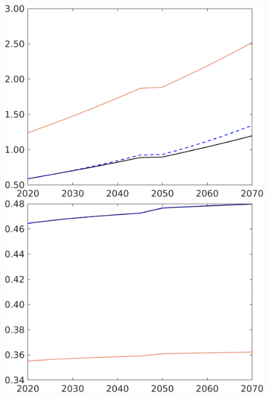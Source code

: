 \begin{figure}[h!!]
\begin{minipage}[]{0.32\textwidth}
\end{minipage}
\begin{minipage}[]{0.32\textwidth}
	\includegraphics[width=1\textwidth]{../../codding_model/own_basedOnFried/optimalPol_190722_tidiedUp/figures/all_10Aout22/CountMod1_target_C_regime3_spillover0_sep1_extern0_PV1_etaa0.79_lgd0.png}
\end{minipage}
\begin{minipage}[]{0.32\textwidth}
	\includegraphics[width=1\textwidth]{../../codding_model/own_basedOnFried/optimalPol_190722_tidiedUp/figures/all_10Aout22/CountMod1_target_hh_regime3_spillover0_sep1_extern0_PV1_etaa0.79_lgd0.png}

\end{minipage}
\end{figure}

